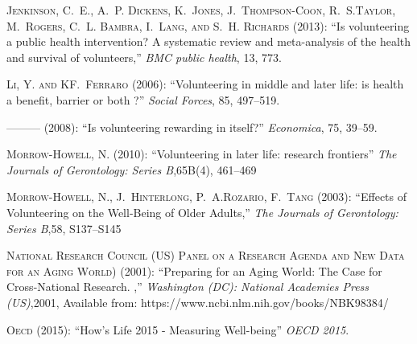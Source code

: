 \documentclass[10pt, letterpaper]{article}
\begin{document}
\begin{spacing}{1.4}
\begin{thebibliography}{87}
\textsc{Jenkinson, C.~E., A.~P. Dickens, K.~Jones, J.~Thompson-Coon, R.~S.Taylor, M.~Rogers, C.~L. Bambra, I.~Lang, and S.~H. Richards} (2013):
  \enquote{Is volunteering a public health intervention? A systematic review and meta-analysis of the health and survival of volunteers,} \emph{BMC public health}, 13, 773.


\textsc{Li, Y. and KF.~Ferraro} (2006): \enquote{Volunteering in middle and later life: is health a benefit, barrier or both ?} \emph{Social Forces}, 85, 497--519. 


---\hspace{-.1pt}---\hspace{-.1pt}--- (2008{}): \enquote{Is volunteering rewarding in itself?} \emph{Economica}, 75, 39--59.

\textsc{Morrow-Howell, N.} (2010):
  \enquote{Volunteering in later life: research frontiers} \emph{The Journals of Gerontology: Series B},65B(4), 461–469


\textsc{Morrow-Howell, N., J.~Hinterlong, P.~A.Rozario, F.~Tang} (2003):
  \enquote{Effects of Volunteering on the Well-Being of Older Adults,} \emph{The Journals of Gerontology: Series B},58, S137--S145

\textsc{National Research Council (US) Panel on a Research Agenda and New Data for an Aging World)} (2001):
  \enquote{Preparing for an Aging World: The Case for Cross-National Research. ,} \emph{Washington (DC): National Academies Press (US)},2001, Available from: https://www.ncbi.nlm.nih.gov/books/NBK98384/


\textsc{Oecd} (2015): \enquote{How's Life  2015 - Measuring Well-being} \emph{OECD 2015}.


\end{thebibliography}
\end{spacing}
\end{document}
